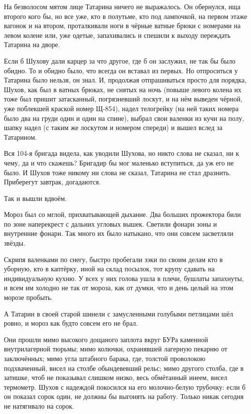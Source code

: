 На безволосом мятом лице Татарина ничего не выражалось. Он обернулся, ища второго кого бы, но
все уже, кто в полутьме, кто под лампочкой, на первом этаже вагонок и на втором, проталкивали
ноги в чёрные ватные брюки с номерами на левом колене или, уже одетые, запахивались и спешили
к выходу \dash переждать Татарина на дворе.

Если б Шухову дали карцер за что другое, где б он заслужил, \dash не так бы было обидно. То и
обидно было, что всегда он вставал из первых. Но отпроситься у Татарина было нельзя, он знал.
И, продолжая отпрашиваться просто для порядка, Шухов, как был в ватных брюках, не снятых на
ночь (повыше левого колена их тоже был пришит затасканный, погрязневший лоскут, и на нём
выведен чёрной, уже поблекшей краской номер Щ-854), надел телогрейку (на ней таких номера было
два \dash на груди один и один на спине), выбрал свои валенки из кучи на полу, шапку надел (с таким
же лоскутом и номером спереди) и вышел вслед за Татарином.

Вся 104-я бригада видела, как уводили Шухова, но никто слова не сказал, ни к чему, да и что
скажешь? Бригадир бы мог маленько вступиться, да уж его не было. И Шухов тоже никому ни слова
не сказал, Татарина не стал дразнить. Приберегут завтрак, догадаются.

Так и вышли вдвоём.

Мороз был со мглой, прихватывающей дыхание. Два больших прожектора били по зоне наперекрест
с дальних угловых вышек. Светили фонари зоны и внутренние фонари. Так много их было натыкано,
что они совсем засветляли звёзды.

Скрипя валенками по снегу, быстро пробегали зэки по своим делам \dash кто в уборную, кто в
каптёрку, иной \dash на склад посылок, тот крупу сдавать на индивидуальную кухню. У всех у них
голова ушла в плечи, бушлаты запахнуты, и всем им холодно не так от мороза, как от думки, что и
день целый на этом морозе пробыть.

А Татарин в своей старой шинели с замусленными голубыми петлицами шёл ровно, и мороз как
будто совсем его не брал.

Они прошли мимо высокого дощаного заплота вкруг БУРа \dash каменной внутрилагерной тюрьмы;
мимо колючки, охранявшей лагерную пекарню от заключённых; мимо угла штабного барака, где,
толстой проволокою подхваченный, висел на столбе обындевевший рельс; мимо другого столба,
где в затишке, чтоб не показывал слишком низко, весь обмётанный инеем, висел термометр. Шухов
с надеждой покосился на его молочно-белую трубочку: если б он показал сорок один, не должны
бы выгонять на работу. Только никак сегодня не натягивало на сорок.

